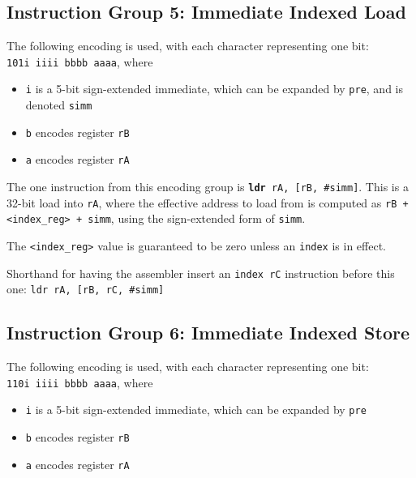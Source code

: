 \documentclass{article}
\begin{document}
	\doublespacing
	\subsection{Instruction Group 5: Immediate Indexed Load}
	The following encoding is used, with each character representing one
	bit: \\
	\texttt{101i iiii bbbb aaaa}, where

	\singlespacing
	\begin{itemize}
	\item \texttt{i} is a 5-bit sign-extended immediate, which can
	be expanded by \texttt{pre}, and is denoted \texttt{simm}
	\item \texttt{b} encodes register \texttt{rB}
	\item \texttt{a} encodes register \texttt{rA}
	\end{itemize}
	\doublespacing

	The one instruction from this encoding group is
	\texttt{\textbf{ldr} rA, [rB, \#simm]}.
	This is a 32-bit load into \texttt{rA}, where the effective address to
	load from is computed as \texttt{rB + <index\_reg> + simm}, using the
	sign-extended form of \texttt{simm}.

	The \texttt{<index\_reg>} value is guaranteed to be zero unless an
	\texttt{index} is in effect.

	Shorthand for having the assembler insert an \texttt{index rC}
	instruction before this one: \texttt{ldr rA, [rB, rC, \#simm]}


	\subsection{Instruction Group 6: Immediate Indexed Store}
	The following encoding is used, with each character representing one
	bit: \\
	\texttt{110i iiii bbbb aaaa}, where

	\singlespacing
	\begin{itemize}
	\item \texttt{i} is a 5-bit sign-extended immediate, which can
	be expanded by \texttt{pre}  
	\item \texttt{b} encodes register \texttt{rB}
	\item \texttt{a} encodes register \texttt{rA}
	\end{itemize}
	\doublespacing
\end{document}
